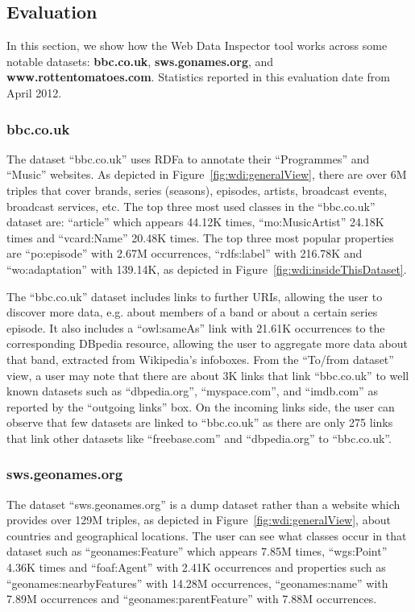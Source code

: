 \subsection{Evaluation}

In this section, we show how the Web Data Inspector tool works across some notable datasets: \textbf{bbc.co.uk}, \textbf{sws.gonames.org}, and \textbf{www.rottentomatoes.com}.
Statistics reported in this evaluation date from April 2012.

\subsubsection{bbc.co.uk}

The dataset ``bbc.co.uk'' uses RDFa to annotate their ``Programmes'' and ``Music'' websites. As depicted in Figure~\ref{fig:wdi:generalView}, there are over 6M triples that cover brands, series (seasons), episodes, artists, broadcast events, broadcast services, etc. The top three most used classes in the ``bbc.co.uk'' dataset are: ``article'' which appears 44.12K times, ``mo:MusicArtist'' 24.18K times and ``vcard:Name'' 20.48K times. The top three most popular properties are ``po:episode'' with 2.67M occurrences, ``rdfs:label'' with 216.78K and ``wo:adaptation'' with 139.14K, as depicted in Figure~\ref{fig:wdi:insideThisDataset}.

The ``bbc.co.uk'' dataset includes links to further URIs, allowing the user to discover more data, e.g. about members of a band or about a certain series episode. It also includes a ``owl:sameAs'' link with 21.61K occurrences to the corresponding DBpedia resource, allowing the user to aggregate more data about that band, extracted from Wikipedia's infoboxes. From the ``To/from dataset'' view, a user may note that there are about 3K links that link ``bbc.co.uk'' to well known datasets such as ``dbpedia.org'', ``myspace.com'', and ``imdb.com'' as reported by the ``outgoing links'' box. On the incoming links side, the user can observe that few datasets are linked to ``bbc.co.uk'' as there are only 275 links that link other datasets like ``freebase.com'' and ``dbpedia.org'' to ``bbc.co.uk''.

\subsubsection{sws.geonames.org}

The dataset ``sws.geonames.org'' is a dump dataset rather than a website which provides over 129M triples, as depicted in Figure~\ref{fig:wdi:generalView}, about countries and geographical locations. The user can see what classes occur in that dataset such as ``geonames:Feature'' which appears 7.85M times, ``wgs:Point'' 4.36K times and ``foaf:Agent'' with 2.41K occurrences and properties such as ``geonames:nearbyFeatures'' with 14.28M occurrences, ``geonames:name'' with 7.89M occurrences and ``geonames:parentFeature'' with 7.88M occurrences.


